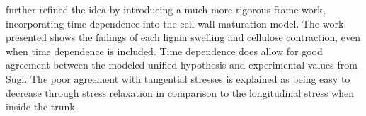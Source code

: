 \citet{Yamamoto_1998} further refined the idea by introducing a much more rigorous frame
work, incorporating time dependence into the cell wall maturation model. The
work presented shows the failings of each lignin swelling and cellulose
contraction, even when time dependence is included. Time dependence does allow
for good agreement between the modeled unified hypothesis and experimental
values from Sugi. The poor agreement with tangential stresses is
explained as being easy to decrease through stress relaxation in comparison to
the longitudinal stress when inside the trunk.
